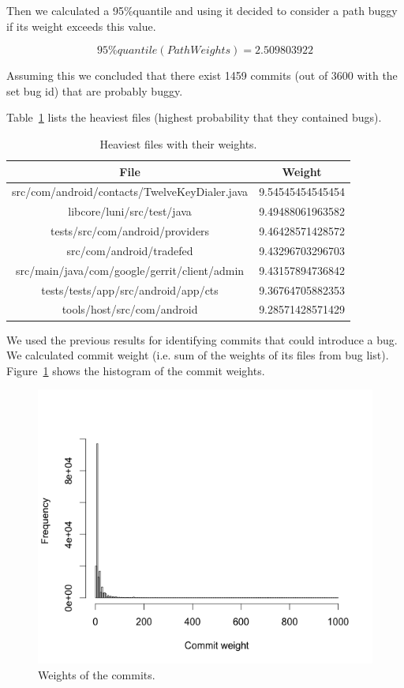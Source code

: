 \documentclass[a4paper,11pt]{article}
\begin{document}
Then we calculated a 95\%quantile and using it decided to consider a path buggy if its weight exceeds this value. 

\[95\%quantile(PathWeights) = 2.509803922\]

Assuming this we concluded that there exist 1459 commits (out of 3600 with the set bug id) that are probably buggy.

Table~\ref{tbl:weights} lists the heaviest files (highest probability that they contained bugs).

\begin{table}[ht!]
\centering
\begin{tabular}{|c|c|}
\hline
File & Weight\tabularnewline
\hline
\hline
src/com/android/contacts/TwelveKeyDialer.java & 9.54545454545454\tabularnewline
\hline
libcore/luni/src/test/java & 9.49488061963582\tabularnewline
\hline
tests/src/com/android/providers & 9.46428571428572\tabularnewline
\hline
src/com/android/tradefed & 9.43296703296703\tabularnewline
\hline
src/main/java/com/google/gerrit/client/admin & 9.43157894736842\tabularnewline
\hline
tests/tests/app/src/android/app/cts & 9.36764705882353\tabularnewline
\hline
tools/host/src/com/android & 9.28571428571429\tabularnewline
\hline
\end{tabular}
\caption{Heaviest files with their weights.}
\label{tbl:weights}
\end{table}

We used the previous results for identifying commits that could introduce a
bug. We calculated commit weight (i.e. sum  of the weights of its files from bug
list). Figure~\ref{fig:commit_weights} shows the histogram of the commit weights.

\begin{figure}[ht!]
\centering
\includegraphics[width=1.2\textwidth]{../diagrams/commit_weight.png}
\caption{Weights of the commits.}
\label{fig:commit_weights}
\end{figure}
\end{document}
